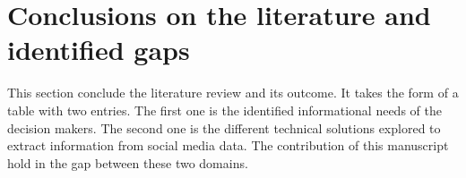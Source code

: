 

\section{Conclusions on the literature and identified gaps}
This section conclude the literature review and its outcome.
It takes the form of a table with two entries.
The first one is the identified informational needs of the decision makers.
The second one is the different technical solutions explored to extract information from social media data.
The contribution of this manuscript hold in the gap between these two domains.

